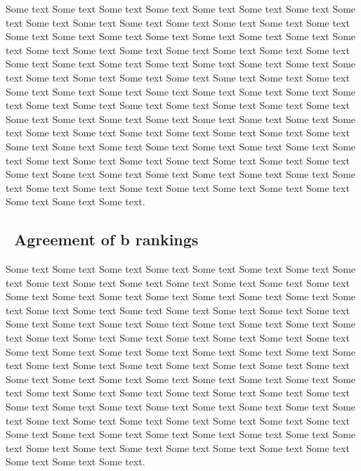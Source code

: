 \begin{multicols}{2}



  Some text Some text Some text Some text Some text Some text Some
  text Some text Some text Some text Some text Some text Some text
  Some text Some text Some text Some text Some text Some text Some
  text Some text Some text Some text Some text Some text Some text
  Some text Some text Some text Some text Some text Some text Some
  text Some text Some text Some text Some text Some text Some text
  Some text Some text Some text Some text Some text Some text Some
  text Some text Some text Some text Some text Some text Some text
  Some text Some text Some text Some text Some text Some text Some
  text Some text Some text Some text Some text Some text Some text
  Some text Some text Some text Some text Some text Some text Some
  text Some text Some text Some text Some text Some text Some text
  Some text Some text Some text Some text Some text Some text Some
  text Some text Some text Some text Some text Some text Some text
  Some text Some text Some text Some text Some text Some text Some
  text Some text Some text Some text Some text Some text Some text
  Some text Some text Some text Some text.

\subsection{\thesubsection~Agreement of b rankings}

  Some text Some text Some text Some text Some text Some text Some
  text Some text Some text Some text Some text Some text Some text
  Some text Some text Some text Some text Some text Some text Some
  text Some text Some text Some text Some text Some text Some text
  Some text Some text Some text Some text Some text Some text Some
  text Some text Some text Some text Some text Some text Some text
  Some text Some text Some text Some text Some text Some text Some
  text Some text Some text Some text Some text Some text Some text
  Some text Some text Some text Some text Some text Some text Some
  text Some text Some text Some text Some text Some text Some text
  Some text Some text Some text Some text Some text Some text Some
  text Some text Some text Some text Some text Some text Some text
  Some text Some text Some text Some text Some text Some text Some
  text Some text Some text Some text Some text Some text Some text
  Some text Some text Some text Some text Some text Some text Some
  text Some text Some text Some text Some text Some text Some text
  Some text Some text Some text Some text.


\end{multicols}
